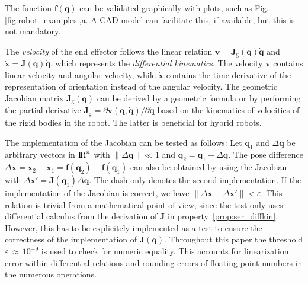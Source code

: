 \documentclass[runningheads]{llncs}
\begin{document}
\begin{test}\label{test:ser_kin}
The function $\bm{f}(\bm{q})$ can be validated graphically with plots, such as Fig.\,\ref{fig:robot_examples},a.
A CAD model can facilitate this, if available, but this is not mandatory.
\end{test}


\begin{property}\label{prop:ser_diffkin}
The \emph{velocity} of the end effector follows the linear relation $\bm{v}{=}\bm{J}_\mathrm{g}(\bm{q})\dot{\bm{q}}$ and $\dot{\bm{x}}{=}\bm{J}(\bm{q})\dot{\bm{q}}$, which represents the \emph{differential kinematics}.
The velocity $\bm{v}$ contains linear velocity and angular velocity, while $\dot{\bm{x}}$ contains the time derivative of the representation of orientation instead of the angular velocity.
The geometric Jacobian matrix $\bm{J}_\mathrm{g}(\bm{q})$ can be derived by a geometric formula or by performing the partial derivative $\bm{J}_{\mathrm{g}}{=}\partial \bm{v}(\bm{q},\dot{\bm{q}}) / \partial \dot{\bm{q}}$ based on the kinematics of velocities of the rigid bodies in the robot.
The latter is beneficial for hybrid robots.
\end{property}

\begin{test}\label{test:ser_diffkin}
The implementation of the Jacobian can be tested as follows:
Let $\bm{q}_1$ and $\Delta \bm{q}$ be arbitrary vectors in ${\rm I\!R}^n$ with $\lVert \Delta \bm{q} \rVert \ll 1$ and $\bm{q}_2{=}\bm{q}_1{+}\Delta \bm{q}$.
The pose difference $\Delta \bm{x}{=}\bm{x}_2{-}\bm{x}_1{=}\bm{f}(\bm{q}_2){-}\bm{f}(\bm{q}_1)$ can also be obtained by using the Jacobian with $\Delta \bm{x}'{=}\bm{J}(\bm{q}_1)\Delta \bm{q}$.
The dash only denotes the second implementation.
If the implementation of the Jacobian is correct, we have $\lVert \Delta\bm{x}{-}\Delta\bm{x}'\rVert {<} \varepsilon$.
This relation is trivial from a mathematical point of view, since the test only uses differential calculus from the derivation of $\bm{J}$ in property~\ref{prop:ser_diffkin}.
However, this has to be explicitely implemented as a test to ensure the correctness of the implementation of $\bm{J}(\bm{q})$.
Throughout this paper the threshold $\varepsilon\,{\approx}\,10^{-9}$ is used to check for numeric equality.
This accounts for linearization error within differential relations and rounding errors of floating point numbers in the numerous operations.
\end{test}
\end{document}
